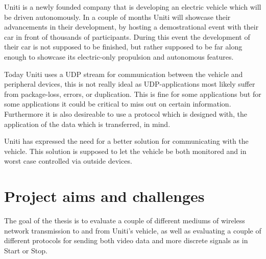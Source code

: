\documentclass[a4paper]{article}
\begin{document}
Uniti is a newly founded company that is developing an electric vehicle which will be driven autonomously.
In a couple of months Uniti will showcase their advancements in their development,
by hosting a demostrational event with their car in front of thousands of participants.
During this event the development of their car is not supposed to be finished, 
but rather supposed to be far along enough to showcase its electric-only propulsion and autonomous features. 

Today Uniti uses a UDP stream for communication between the vehicle and
peripheral devices, this is not really ideal as UDP-applications most likely
suffer from package-loss, errors, or duplication. This is fine for some
applications but for some applications it could be critical to miss out on certain information. Furthermore it is also desireable to use a protocol which is designed with, the application of the data which is transferred, in mind.

Uniti has expressed the need for a better solution for communicating with the vehicle.
This solution is supposed to let the vehicle be both monitored and in worst case controlled via outside devices.


%

\section{Project aims and challenges}


The goal of the thesis is to evaluate a couple of different mediums of wireless
network transmission to and from Uniti's vehicle, as well as evaluating a couple
of different protocols for sending both video data and more discrete signals as
in Start or Stop.
\end{document}
